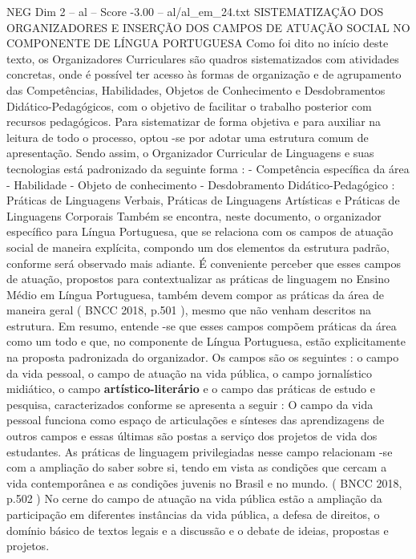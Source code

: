\begin{textsample}{NEG Dim 2 – al – Score -3.00 – al/al\_em\_24.txt}  \label{ex:f2_neg_026}
SISTEMATIZAÇÃO DOS ORGANIZADORES E INSERÇÃO DOS CAMPOS DE ATUAÇÃO SOCIAL NO COMPONENTE DE LÍNGUA PORTUGUESA Como foi dito no início deste texto, os Organizadores Curriculares são quadros sistematizados com atividades concretas, onde é possível ter acesso às formas de organização e de agrupamento das Competências, Habilidades, Objetos de Conhecimento e Desdobramentos Didático-Pedagógicos, com o objetivo de facilitar o trabalho posterior com recursos pedagógicos.
Para sistematizar de forma objetiva e para auxiliar na leitura de todo o processo, optou -se por adotar uma estrutura comum de apresentação.
Sendo assim, o Organizador Curricular de Linguagens e suas tecnologias está padronizado da seguinte forma : - Competência específica da área - Habilidade - Objeto de conhecimento - Desdobramento Didático-Pedagógico : Práticas de Linguagens Verbais, Práticas de Linguagens Artísticas e Práticas de Linguagens Corporais Também se encontra, neste documento, o organizador específico para Língua Portuguesa, que se relaciona com os campos de atuação social de maneira explícita, compondo um dos elementos da estrutura padrão, conforme será observado mais adiante.
É conveniente perceber que esses campos de atuação, propostos para contextualizar as práticas de linguagem no Ensino Médio em Língua Portuguesa, também devem compor as práticas da área de maneira geral ( BNCC 2018, p.501 ), mesmo que não venham descritos na estrutura.
Em resumo, entende -se que esses campos compõem práticas da área como um todo e que, no componente de Língua Portuguesa, estão explicitamente na proposta padronizada do organizador.
Os campos são os seguintes : o campo da vida pessoal, o campo de atuação na vida pública, o campo jornalístico midiático, o campo \textbf{artístico-literário} e o campo das práticas de estudo e pesquisa, caracterizados conforme se apresenta a seguir : O campo da vida pessoal funciona como espaço de articulações e sínteses das aprendizagens de outros campos e essas últimas são postas a serviço dos projetos de vida dos estudantes.
As práticas de linguagem privilegiadas nesse campo relacionam -se com a ampliação do saber sobre si, tendo em vista as condições que cercam a vida contemporânea e as condições juvenis no Brasil e no mundo. ( BNCC 2018, p.502 ) No cerne do campo de atuação na vida pública estão a ampliação da participação em diferentes instâncias da vida pública, a defesa de direitos, o domínio básico de textos legais e a discussão e o debate de ideias, propostas e projetos.

\end{textsample}
